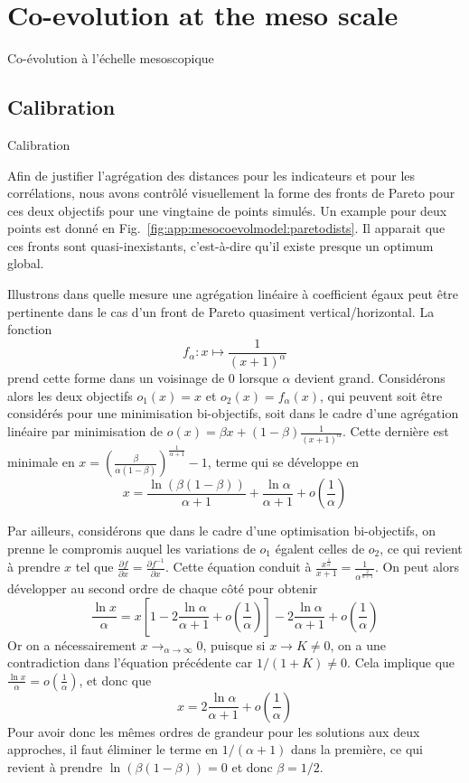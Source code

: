 \newpage

\section{Co-evolution at the meso scale}{Co-évolution à l'échelle mesoscopique}

\label{app:sec:mesocoevolmodel}


\subsection{Calibration}{Calibration}


Afin de justifier l'agrégation des distances pour les indicateurs et pour les corrélations, nous avons contrôlé visuellement la forme des fronts de Pareto pour ces deux objectifs pour une vingtaine de points simulés. Un example pour deux points est donné en Fig.~\ref{fig:app:mesocoevolmodel:paretodists}. Il apparait que ces fronts sont quasi-inexistants, c'est-à-dire qu'il existe presque un optimum global.

Illustrons dans quelle mesure une agrégation linéaire à coefficient égaux peut être pertinente dans le cas d'un front de Pareto quasiment vertical/horizontal. La fonction
\[
f_{\alpha} : x \mapsto \frac{1}{(x+1)^\alpha}
\]
prend cette forme dans un voisinage de 0 lorsque $\alpha$ devient grand. Considérons alors les deux objectifs $o_1(x) = x$ et $o_2(x) = f_{\alpha}(x)$, qui peuvent soit être considérés pour une minimisation bi-objectifs, soit dans le cadre d'une agrégation linéaire par minimisation de $o(x) = \beta x + (1-\beta) \frac{1}{(x+1)^{\alpha}}$. Cette dernière est minimale en $x = \left(\frac{\beta}{\alpha (1-\beta)}\right)^{\frac{1}{\alpha + 1}} - 1$, terme qui se développe en 
\[
x = \frac{\ln\left(\beta (1-\beta)\right)}{\alpha + 1} + \frac{\ln\alpha}{\alpha + 1} + o(\frac{1}{\alpha})
\]

Par ailleurs, considérons que dans le cadre d'une optimisation bi-objectifs, on prenne le compromis auquel les variations de $o_1$ égalent celles de $o_2$, ce qui revient à prendre $x$ tel que $\frac{\partial f}{\partial x} = \frac{\partial f^{-1}}{\partial x}$. Cette équation conduit à $\frac{x^{\frac{1}{\alpha}}}{x + 1} = \frac{1}{\alpha^{\frac{2}{\alpha + 1}}}$. On peut alors développer au second ordre de chaque côté pour obtenir
\[
\frac{\ln x}{\alpha} = x \left[1 - 2 \frac{\ln \alpha}{\alpha + 1} + o(\frac{1}{\alpha})\right] - 2 \frac{\ln \alpha}{\alpha + 1} + o(\frac{1}{\alpha}) 
\]
Or on a nécessairement $x\rightarrow_{\alpha \rightarrow \infty} 0$, puisque si $x \rightarrow K \neq 0$, on a une contradiction dans l'équation précédente car $1/(1+K) \neq 0$. Cela implique que $\frac{\ln x}{\alpha} = o(\frac{1}{\alpha})$, et donc que
\[
x = 2 \frac{\ln \alpha}{\alpha + 1} + o(\frac{1}{\alpha})
\]
Pour avoir donc les mêmes ordres de grandeur pour les solutions aux deux approches, il faut éliminer le terme en $1/(\alpha + 1)$ dans la première, ce qui revient à prendre $\ln \left(\beta (1- \beta)\right) = 0$ et donc $\beta = 1/2$.

